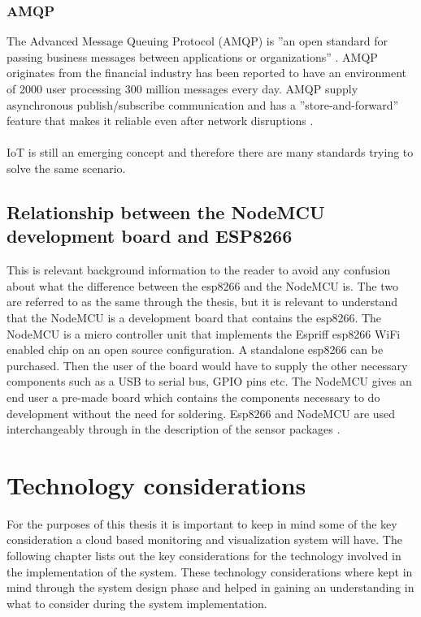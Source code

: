 \documentclass[]{uiophd}
\begin{document}
\subsection{AMQP}
The Advanced Message Queuing Protocol (AMQP) is ''an open standard for passing business messages between applications or organizations'' \cite{amqp}. AMQP originates from the financial industry has been reported to have an environment of 2000 user processing 300 million messages every day. AMQP supply asynchronous publish/subscribe communication and has a ''store-and-forward'' feature that makes it reliable even after network disruptions \cite{karagiannis2015survey}. 
\\\\
IoT is still an emerging concept and therefore there are many standards trying to solve the same scenario.

\section{Relationship between the NodeMCU development board and ESP8266}
This is relevant background information to the reader to avoid any confusion about what the difference between the esp8266 and the NodeMCU is. The two are referred to as the same through the thesis, but it is relevant to understand that the NodeMCU is a development board that contains the esp8266. The NodeMCU is a micro controller unit that implements the Espriff esp8266 WiFi enabled chip on an open source configuration. A standalone esp8266 can be purchased. Then the user of the board would have to supply the other necessary components such as a USB to serial bus, GPIO pins etc. The NodeMCU gives an end user a pre-made board which contains the components necessary to do development without the need for soldering. Esp8266 and NodeMCU are used interchangeably through in the description of the sensor packages \cite{espressif}.

\chapter{Technology considerations}

For the purposes of this thesis it is important to keep in mind some of the key consideration a cloud based monitoring and visualization system will have. The following chapter lists out the key considerations for the technology involved in the implementation of the system. These technology considerations where kept in mind through the system design phase and helped in gaining an understanding in what to consider during the system implementation.
\end{document}

